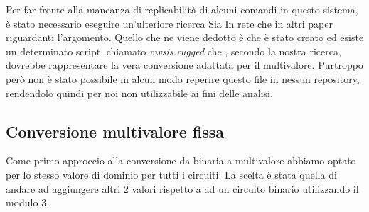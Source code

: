\documentclass[italian,]{book}
\begin{document}
Per far fronte alla mancanza di replicabilità di alcuni comandi in questo sistema, è stato necessario eseguire un'ulteriore ricerca Sia In rete che in altri paper riguardanti l'argomento. Quello che ne viene dedotto è che è stato creato ed esiste un determinato script, chiamato \emph{mvsis.rugged} che , secondo la nostra ricerca, dovrebbe rappresentare la vera conversione adattata per il multivalore. Purtroppo però non è stato possibile in alcun modo reperire questo file in nessun repository, rendendolo quindi per noi non utilizzabile ai fini delle analisi.

\newpage

\hypertarget{conversione-multivalore-fissa}{%
\subsection{Conversione multivalore fissa}\label{conversione-multivalore-fissa}}

Come primo approccio alla conversione da binaria a multivalore abbiamo optato per lo stesso valore di dominio per tutti i circuiti. La scelta è stata quella di andare ad aggiungere altri 2 valori rispetto a ad un circuito binario utilizzando il modulo 3.
\end{document}
